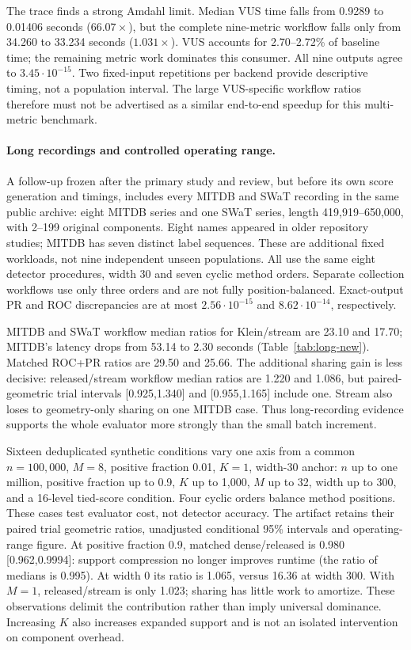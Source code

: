 The trace finds a strong Amdahl limit. Median VUS time falls from 0.9289 to
0.01406 seconds ($66.07\times$), but the complete nine-metric workflow falls
only from 34.260 to 33.234 seconds ($1.031\times$). VUS accounts for
2.70--2.72\% of baseline time; the remaining metric work dominates this
consumer. All nine outputs agree to $3.45\cdot10^{-15}$. Two fixed-input
repetitions per backend provide descriptive timing, not a population interval.
The large VUS-specific workflow ratios therefore must not be advertised as a
similar end-to-end speedup for this multi-metric benchmark.

\paragraph{Long recordings and controlled operating range.}
A follow-up frozen after the primary study and review, but before its own
score generation and timings, includes every MITDB and SWaT recording in the
same public archive: eight MITDB series and one SWaT series, length
419,919--650,000, with 2--199 original components. Eight names appeared in
older repository studies; MITDB has seven distinct label sequences. These are
additional fixed workloads, not nine independent unseen populations.
All use the same eight detector procedures, width 30 and seven cyclic method
orders. Separate collection workflows use only three orders and are not fully
position-balanced. Exact-output PR and ROC discrepancies are at most
$2.56\cdot10^{-15}$ and $8.62\cdot10^{-14}$, respectively.

MITDB and SWaT workflow median ratios for Klein/stream are 23.10 and 17.70;
MITDB's latency drops from 53.14 to 2.30 seconds
(Table~\ref{tab:long-new}). Matched ROC+PR ratios are 29.50 and 25.66.
The additional sharing gain is less decisive: released/stream workflow
median ratios are 1.220 and 1.086, but paired-geometric trial intervals
[0.925,1.340] and [0.955,1.165] include one. Stream also loses to
geometry-only sharing on one MITDB case. Thus long-recording evidence supports
the whole evaluator more strongly than the small batch increment.

Sixteen deduplicated synthetic conditions vary one axis from a common
$n=100{,}000$, $M=8$, positive fraction 0.01, $K=1$, width-30 anchor:
$n$ up to one million, positive fraction up to 0.9, $K$ up to 1,000,
$M$ up to 32, width up to 300, and a 16-level tied-score condition.
Four cyclic orders balance method positions. These cases test evaluator cost,
not detector accuracy. The artifact retains their paired trial geometric
ratios, unadjusted conditional 95\% intervals and operating-range figure.
At positive fraction 0.9, matched dense/released is 0.980 [0.962,0.9994]:
support compression no longer improves runtime (the ratio of medians is
0.995). At width 0 its ratio is 1.065, versus 16.36 at width 300. With
$M=1$, released/stream is only 1.023; sharing has little work to amortize.
These observations delimit the contribution rather than imply universal
dominance. Increasing $K$ also increases expanded support and is not an
isolated intervention on component overhead.

